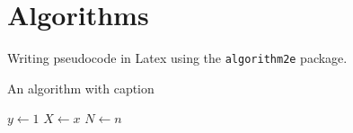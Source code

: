 \newpage
\section{Algorithms}

Writing pseudocode in Latex using the \verb|algorithm2e| package.

\begin{algorithm}
\caption{An algorithm with caption}\label{alg:one}

\BlankLine

$y \gets 1$\;
$X \gets x$\;
$N \gets n$\;
\BlankLine

\end{algorithm}
